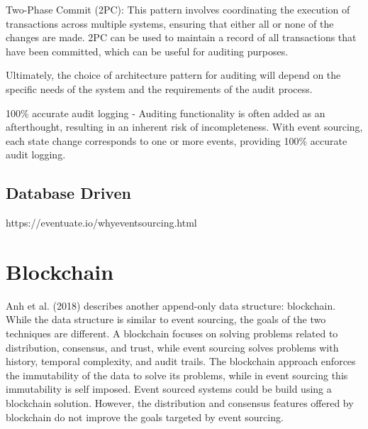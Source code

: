 Two-Phase Commit (2PC): This pattern involves coordinating the execution of transactions across multiple systems, ensuring that either all or none of the changes are made. 2PC can be used to maintain a record of all transactions that have been committed, which can be useful for auditing purposes.

Ultimately, the choice of architecture pattern for auditing will depend on the specific needs of the system and the requirements of the audit process.

100\% accurate audit logging - Auditing functionality is often added as an afterthought, resulting in an inherent risk of incompleteness. With event sourcing, each state change corresponds to one or more events, providing 100\% accurate audit logging.~\citep{richardson2018microservices} %

\subsection{Database Driven}


https://eventuate.io/whyeventsourcing.html

\section{Blockchain}

Anh et al. (2018) describes another append-only data structure: blockchain. While the data structure is similar to event sourcing, the goals of the two techniques are different. A blockchain focuses on solving problems related to distribution, consensus, and trust, while event sourcing solves problems with history, temporal complexity, and audit trails. The blockchain approach enforces the immutability of the data to solve its problems, while in event sourcing this immutability is self imposed. Event sourced systems could be build using a blockchain solution. However, the distribution and consensus features offered by blockchain do not improve the goals targeted by event sourcing.

